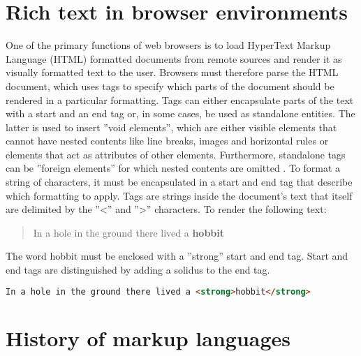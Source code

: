 \section{Rich text in browser environments}

One of the primary functions of web browsers is to load HyperText Markup Language (HTML) formatted documents from remote sources and render it as visually formatted text to the user. Browsers must therefore parse the HTML document, which uses tags to specify which parts of the document should be rendered in a particular formatting. Tags can either encapsulate parts of the text with a start and an end tag or, in some cases, be used as standalone entities. 
The latter is used to insert ''void elements'', which are either visible elements that cannot have nested contents like line breaks, images and horizontal rules or elements that act as attributes of other elements. Furthermore, standalone tags can be ''foreign elements'' for which nested contents are omitted \cite[Elements]{HTML5}. 
To format a string of characters, it must be encapsulated in a start and end tag that describe which formatting to apply. Tags are strings inside the document's text that itself are delimited by the ''<'' and ''>'' characters. To render the following text: 

\begin{quotation}
In a hole in the ground there lived a \textbf{hobbit}
\end{quotation}

The word hobbit must be enclosed with a ''strong'' start and end tag. Start and end tags are distinguished by adding a solidus to the end tag.

\begin{lstlisting}[language=html, caption=Text formatted as bold, label=lst:div-contenteditable]
In a hole in the ground there lived a <strong>hobbit</strong>
\end{lstlisting}



\section{History of markup languages}